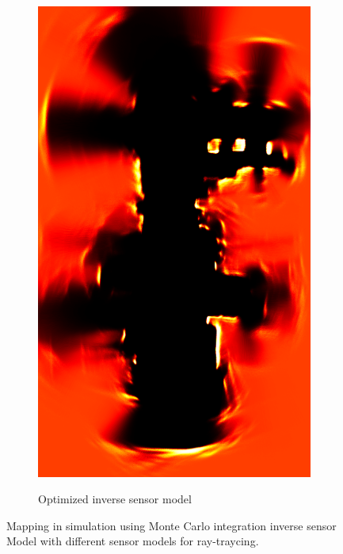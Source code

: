 \begin{figure}[htbp]
\begin{subfigure}[t]{0.45\textwidth}
		\includegraphics[width=\textwidth]{figures/static_mapping/monte_carlo_map_optimized}		
		\label{fig:particle_shot-croped}
		\caption{Optimized inverse sensor model}
	\end{subfigure}
	\caption{Mapping in simulation using Monte Carlo integration inverse sensor Model with different sensor models for ray-traycing.}
\end{figure}

